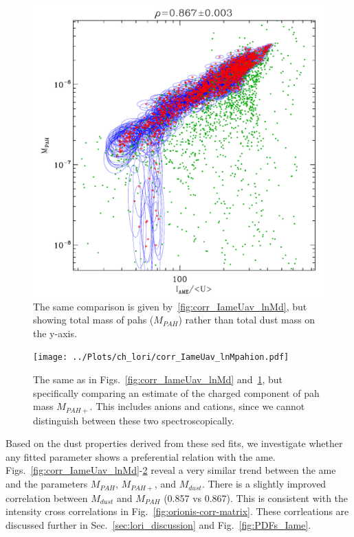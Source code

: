               \begin{figure}
                \includegraphics[width=\textwidth]{../Plots/ch_lori/corr_IameUav_lnMpah.pdf}
                \centering
                \caption{The same comparison is given by~\ref{fig:corr_IameUav_lnMd}, but showing total mass of \acrshort{pah}s ($M_{PAH}$) rather than total dust mass on the y-axis. }
                \label{fig:corr_IameUav_lnMpah}
              \end{figure}
              \begin{figure}
                \texttt{[image: ../Plots/ch\_lori/corr\_IameUav\_lnMpahion.pdf]}
                \centering
                \caption{ The same as in Figs.~\ref{fig:corr_IameUav_lnMd} and~\ref{fig:corr_IameUav_lnMpah}, but specifically comparing an estimate of the charged component of \acrshort{pah} mass $M_{PAH+}$. This includes anions and cations, since we cannot distinguish between these two spectroscopically.}
                \label{fig:corr_IameUav_lnMpahion}
              \end{figure}
    Based on the dust properties derived from these \acrshort{sed} fits, we investigate whether any fitted parameter shows a preferential relation with the \acrshort{ame}. Figs.~\ref{fig:corr_IameUav_lnMd}-\ref{fig:corr_IameUav_lnMpahion} reveal a very similar trend between the \acrshort{ame} and the parameters $M_{PAH}$, $M_{PAH+}$, and $M_{dust}$. There is a slightly improved correlation between $M_{dust}$ and $M_{PAH}$ (0.857 vs 0.867). This is consistent with the intensity cross correlations in Fig.~\ref{fig:orionis-corr-matrix}. These corrleations are discussed further in Sec.~\ref{sec:lori_discussion} and Fig.~\ref{fig:PDFs_Iame}.

